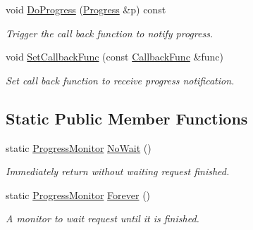 \begin{DoxyCompactItemize}
\mbox{\label{classmilvus_1_1_progress_monitor_a1cd0daacb59bb661921da644e4e836a4}} 
void \hyperlink{classmilvus_1_1_progress_monitor_a1cd0daacb59bb661921da644e4e836a4}{Do\+Progress} (\hyperlink{structmilvus_1_1_progress}{Progress} \&p) const
\begin{DoxyCompactList}\small\item\em Trigger the call back function to notify progress. \end{DoxyCompactList}\item 
void \hyperlink{classmilvus_1_1_progress_monitor_a529c4122413fa59fbb46cf85f7e56d3f}{Set\+Callback\+Func} (const \hyperlink{classmilvus_1_1_progress_monitor_a8d463fa6891b76c10e1088294f64d81f}{Callback\+Func} \&func)
\begin{DoxyCompactList}\small\item\em Set call back function to receive progress notification. \end{DoxyCompactList}\end{DoxyCompactItemize}
\subsection*{Static Public Member Functions}
\begin{DoxyCompactItemize}
\item 
\mbox{\label{classmilvus_1_1_progress_monitor_ab6649b1a1ca207cd43ba72dc5893bffa}} 
static \hyperlink{classmilvus_1_1_progress_monitor}{Progress\+Monitor} \hyperlink{classmilvus_1_1_progress_monitor_ab6649b1a1ca207cd43ba72dc5893bffa}{No\+Wait} ()
\begin{DoxyCompactList}\small\item\em Immediately return without waiting request finished. \end{DoxyCompactList}\item 
\mbox{\label{classmilvus_1_1_progress_monitor_afad65b07af8419780f2457992ee7ce7d}} 
static \hyperlink{classmilvus_1_1_progress_monitor}{Progress\+Monitor} \hyperlink{classmilvus_1_1_progress_monitor_afad65b07af8419780f2457992ee7ce7d}{Forever} ()
\begin{DoxyCompactList}\small\item\em A monitor to wait request until it is finished. \end{DoxyCompactList}\end{DoxyCompactItemize}


